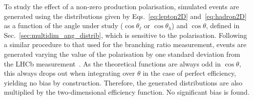 To study the effect of a non-zero \Lb production polarisation, simulated events are generated 
using the distributions given by Eqs.~\ref{eq:lepton2D} and~\ref{eq:hadron2D} as a function of the
angle under study ($\cos\theta_\ell$ or $\cos\theta_h$) and $\cos\theta$, defined in Sec.~\ref{sec:multidim_ang_distrib}, 
which is sensitive to the polarisation.
Following a similar procedure to that used for the branching ratio measurement, events are generated varying
the value of the polarisation by one standard deviation from the LHCb measurement~\cite{Aaij:2013oxa}.
As the theoretical functions are always odd in $\cos \theta$, this always
drops out when integrating over $\theta$ in the case of perfect efficiency, yielding no bias by construction. Therefore, the 
generated distributions are also multiplied by the two-dimensional efficiency function. No significant bias is found.






